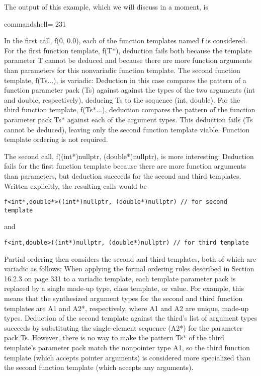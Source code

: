The output of this example, which we will discuss in a moment, is

\begin{tcblisting}{commandshell={}}
231
\end{tcblisting}

In the first call, f(0, 0.0), each of the function templates named f is considered. For the first function template, f(T*), deduction fails both because the template parameter T cannot be deduced and because there are more function arguments than parameters for this nonvariadic function template. The second function template, f(Ts...), is variadic: Deduction in this case compares the pattern of a function parameter pack (Ts) against against the types of the two arguments (int and double, respectively), deducing Ts to the sequence (int, double). For the third function template, f(Ts*...), deduction compares the pattern of the function parameter pack Ts* against each of the argument types. This deduction fails (Ts cannot be deduced), leaving only the second function template viable. Function template ordering is not required.

The second call, f((int*)nullptr, (double*)nullptr), is more interesting: Deduction fails for the first function template because there are more function arguments than parameters, but deduction succeeds for the second and third templates. Written explicitly, the resulting calls would be

\begin{lstlisting}[style=styleCXX]
f<int*,double*>((int*)nullptr, (double*)nullptr) // for second template
\end{lstlisting}

and

\begin{lstlisting}[style=styleCXX]
f<int,double>((int*)nullptr, (double*)nullptr) // for third template
\end{lstlisting}

Partial ordering then considers the second and third templates, both of which are variadic as follows: When applying the formal ordering rules described in Section 16.2.3 on page 331 to a variadic template, each template parameter pack is replaced by a single made-up type, class template, or value. For example, this means that the synthesized argument types for the second and third function templates are A1 and A2*, respectively, where A1 and A2 are unique, made-up types. Deduction of the second template against the third’s list of argument types succeeds by substituting the single-element sequence (A2*) for the parameter pack Ts. However, there is no way to make the pattern Ts* of the third template’s parameter pack match the nonpointer type A1, so the third function template (which accepts pointer arguments) is considered more specialized than the second function template (which accepts any arguments).

